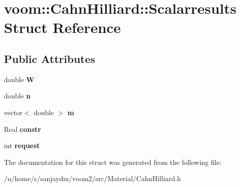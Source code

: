 \hypertarget{structvoom_1_1_cahn_hilliard_1_1_scalarresults}{
\section{voom::CahnHilliard::Scalarresults Struct Reference}
\label{structvoom_1_1_cahn_hilliard_1_1_scalarresults}
}
\subsection*{Public Attributes}
\begin{DoxyCompactItemize}
\item 
\hypertarget{structvoom_1_1_cahn_hilliard_1_1_scalarresults_a475e7020265e34936e6f0e5624205dca}{
double {\bfseries W}}
\label{structvoom_1_1_cahn_hilliard_1_1_scalarresults_a475e7020265e34936e6f0e5624205dca}

\item 
\hypertarget{structvoom_1_1_cahn_hilliard_1_1_scalarresults_a14e39bc66bd9f357e99a92db61148e36}{
double {\bfseries n}}
\label{structvoom_1_1_cahn_hilliard_1_1_scalarresults_a14e39bc66bd9f357e99a92db61148e36}

\item 
\hypertarget{structvoom_1_1_cahn_hilliard_1_1_scalarresults_a797a138474355866342950d44c71bc2d}{
vector$<$ double $>$ {\bfseries m}}
\label{structvoom_1_1_cahn_hilliard_1_1_scalarresults_a797a138474355866342950d44c71bc2d}

\item 
\hypertarget{structvoom_1_1_cahn_hilliard_1_1_scalarresults_ae95c3dce8aeca4800a7700e69db5009b}{
Real {\bfseries constr}}
\label{structvoom_1_1_cahn_hilliard_1_1_scalarresults_ae95c3dce8aeca4800a7700e69db5009b}

\item 
\hypertarget{structvoom_1_1_cahn_hilliard_1_1_scalarresults_ae5e76e6c643c5d80e1a9bc2e9c5f0861}{
int {\bfseries request}}
\label{structvoom_1_1_cahn_hilliard_1_1_scalarresults_ae5e76e6c643c5d80e1a9bc2e9c5f0861}

\end{DoxyCompactItemize}


The documentation for this struct was generated from the following file:\begin{DoxyCompactItemize}
\item 
/u/home/s/sanjaydm/voom2/src/Material/CahnHilliard.h\end{DoxyCompactItemize}
